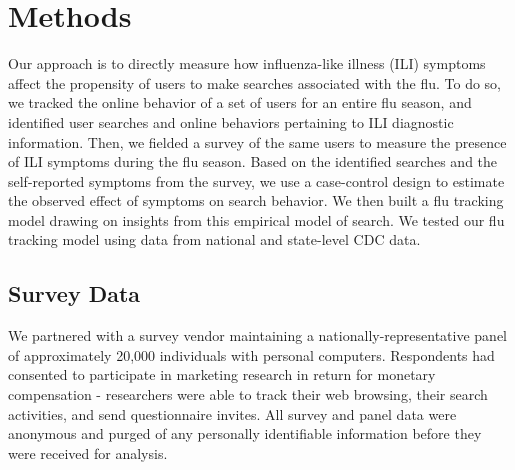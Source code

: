 \documentclass[fleqn,10pt]{wlscirep}
\begin{document}



\section*{Methods}

Our approach is to directly measure how influenza-like illness (ILI) symptoms affect the propensity of users to make searches associated with the flu. To do so, we tracked the online behavior of a set of users for an entire flu season, and identified user searches and online behaviors pertaining to ILI diagnostic information. Then, we fielded a survey of the same users to measure the presence of ILI symptoms during the flu season. Based on the identified searches and the self-reported symptoms from the survey, we use a case-control design to estimate the observed effect of symptoms on search behavior. We then built a flu tracking model drawing on insights from this empirical model of search. We tested our flu tracking model using data from national and state-level CDC data. 

\subsection*{Survey Data}

We partnered with a survey vendor maintaining a nationally-representative panel of approximately 20,000 individuals with personal computers. Respondents had consented to participate in marketing research in return for monetary compensation - researchers were able to track their web browsing, their search activities, and send questionnaire invites. All survey and panel data were anonymous and purged of any personally identifiable information before they were received for analysis. 
\end{document}
